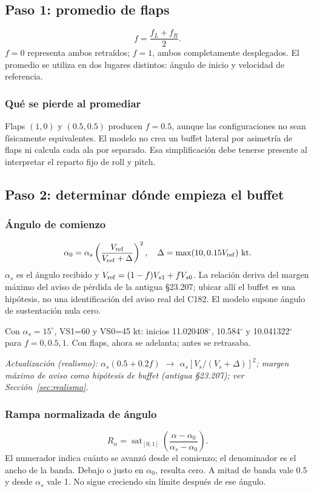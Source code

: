 \documentclass[11pt,a4paper]{article}
\newcommand{\sat}{\operatorname{sat}}
\begin{document}
\subsection{Paso 1: promedio de flaps}
\begin{equation}
f=\frac{f_L+f_R}{2}.
\end{equation}
$f=0$ representa ambos retraídos; $f=1$, ambos completamente desplegados. El promedio se utiliza en dos lugares distintos: ángulo de inicio y velocidad de referencia.

\subsubsection{Qué se pierde al promediar}
Flaps $(1,0)$ y $(0.5,0.5)$ producen $f=0.5$, aunque las configuraciones no sean físicamente equivalentes. El modelo no crea un buffet lateral por asimetría de flaps ni calcula cada ala por separado. Esa simplificación debe tenerse presente al interpretar el reparto fijo de roll y pitch.

\subsection{Paso 2: determinar dónde empieza el buffet}
\subsubsection{Ángulo de comienzo}
\begin{equation}
\alpha_0=\alpha_s\left(\frac{V_{\rm ref}}{V_{\rm ref}+\Delta}\right)^2,\quad \Delta=\max(10,0.15V_{\rm ref})\ {\rm kt}.
\label{eq:stall-onset}
\end{equation}
$\alpha_s$ es el ángulo recibido y $V_{\rm ref}=(1-f)V_{s1}+fV_{s0}$. La relación deriva del margen máximo del aviso de pérdida de la antigua §23.207; ubicar allí el buffet es una hipótesis, no una identificación del aviso real del C182. El modelo supone ángulo de sustentación nula cero.

Con $\alpha_s=15^\circ$, VS1=60 y VS0=45 kt: inicios 11.020408$^\circ$, 10.584$^\circ$ y 10.041322$^\circ$ para $f=0,0.5,1$. Con flaps, ahora se adelanta; antes se retrasaba.

\textit{Actualización (realismo): $\alpha_s(0.5+0.2f)$ $\rightarrow$ $\alpha_s[V_s/(V_s+\Delta)]^2$; margen máximo de aviso como hipótesis de buffet (antigua §23.207); ver Sección~\ref{sec:realismo}.}

\subsubsection{Rampa normalizada de ángulo}
\begin{equation}
R_\alpha=\sat_{[0,1]}\left(\frac{\alpha-\alpha_0}{\alpha_s-\alpha_0}\right).
\label{eq:stall-ramp}
\end{equation}
El numerador indica cuánto se avanzó desde el comienzo; el denominador es el ancho de la banda. Debajo o justo en $\alpha_0$, resulta cero. A mitad de banda vale 0.5 y desde $\alpha_s$ vale 1. No sigue creciendo sin límite después de ese ángulo.
\end{document}
